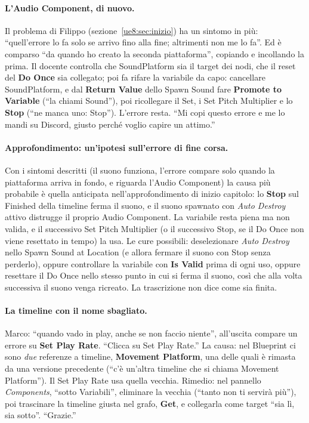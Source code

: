 \paragraph{L'Audio Component, di nuovo.} Il problema di Filippo (sezione~\ref{ue8:sec:inizio})
ha un sintomo in più: ``quell'errore lo fa solo se arrivo fino alla fine; altrimenti non
me lo fa''. Ed è comparso ``da quando ho creato la seconda piattaforma'', copiando e
incollando la prima. Il docente controlla che SoundPlatform sia il target dei nodi, che il
reset del \textbf{Do Once} sia collegato; poi fa rifare la variabile da capo: cancellare
SoundPlatform, e dal \textbf{Return Value} dello Spawn Sound fare \textbf{Promote to
Variable} (``la chiami Sound''), poi ricollegare il Set, i Set Pitch Multiplier e lo
\textbf{Stop} (``ne manca uno: Stop''). L'errore resta. ``Mi copi questo errore e me lo
mandi su Discord, giusto perché voglio capire un attimo.''

\paragraph{Approfondimento: un'ipotesi sull'errore di fine corsa.} Con i sintomi descritti
(il suono funziona, l'errore compare solo quando la piattaforma arriva in fondo, e
riguarda l'Audio Component) la causa più probabile è quella anticipata
nell'approfondimento di inizio capitolo: lo \textbf{Stop} sul Finished della timeline
ferma il suono, e il suono spawnato con \emph{Auto Destroy} attivo distrugge il proprio
Audio Component. La variabile resta piena ma non valida, e il successivo Set Pitch
Multiplier (o il successivo Stop, se il Do Once non viene resettato in tempo) la usa. Le
cure possibili: deselezionare \emph{Auto Destroy} nello Spawn Sound at Location (e allora
fermare il suono con Stop senza perderlo), oppure controllare la variabile con \textbf{Is
Valid} prima di ogni uso, oppure resettare il Do Once nello stesso punto in cui si ferma il
suono, così che alla volta successiva il suono venga ricreato. La trascrizione non dice
come sia finita.

\paragraph{La timeline con il nome sbagliato.} Marco: ``quando vado in play, anche se non
faccio niente'', all'uscita compare un errore su \textbf{Set Play Rate}. ``Clicca su Set
Play Rate.'' La causa: nel Blueprint ci sono \emph{due} referenze a timeline,
\textbf{Movement Platform}, una delle quali è rimasta da una versione precedente (``c'è
un'altra timeline che si chiama Movement Platform''). Il Set Play Rate usa quella
vecchia. Rimedio: nel pannello \emph{Components}, ``sotto Variabili'', eliminare la
vecchia (``tanto non ti servirà più''), poi trascinare la timeline giusta nel grafo,
\textbf{Get}, e collegarla come target ``sia lì, sia sotto''. ``Grazie.''

